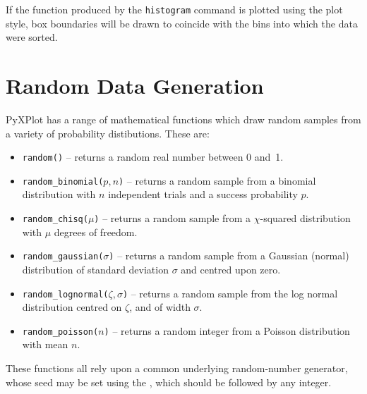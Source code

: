 If the function produced by the {\tt histogram} command is plotted using the
 plot style, box boundaries will be drawn to coincide with the
bins into which the data were sorted.

\section{Random Data Generation}

PyXPlot has a range of mathematical functions which draw random samples from a
variety of probability distibutions. These are:

\begin{itemize}
\item {\tt random()} -- returns a random real number between 0 and~1.
\item {\tt random\_binomial($p,n$)} -- returns a random sample from a binomial distribution with $n$ independent trials and a success probability $p$.
\item {\tt random\_chisq($\mu$)} -- returns a random sample from a $\chi$-squared distribution with $\mu$ degrees of freedom.
\item {\tt random\_gaussian($\sigma$)} -- returns a random sample from a Gaussian (normal) distribution of standard deviation $\sigma$ and centred upon zero.
\item {\tt random\_lognormal($\zeta,\sigma$)} -- returns a random sample from the log normal distribution centred on $\zeta$, and of width $\sigma$.
\item {\tt random\_poisson($n$)} -- returns a random integer from a Poisson distribution with mean $n$.
\end{itemize}

\noindent These functions all rely upon a common underlying random-number
generator, whose seed may be set using the , which should be
followed by any integer.

